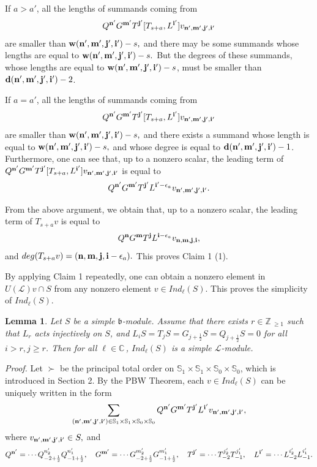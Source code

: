 \documentclass[12pt]{article}
\def\ssc{\scriptscriptstyle}
\def\Z{\mathbb{Z}{\ssc\,}}
\def\C{\mathbb{C}{\ssc\,}}
\numberwithin{equation}{section}
\newtheorem{lemm}[theo]{Lemma}
\begin{document}
If  $a>a'$, all the lengths of summands coming from
$$Q^{\bf n'}G^{\bf m'}T^{\bf j'}[T_{s+a},L^{\bf i'}]v_{\bf n',m',j',i'}$$ are  smaller than ${\bf w(n',m',j',i')}-s,$ and there may be some summands whose lengths are equal to ${\bf w(n',m',j',i')}-s.$ But the degrees of these summands, whose lengths are equal to ${\bf w(n',m',j',i')}-s$, must be smaller than   ${\bf d(n',m',j',i')}-2$.

If $a=a'$,  all the lengths of summands coming from
$$Q^{\bf n'}G^{\bf m'}T^{\bf j'}[T_{s+a},L^{\bf i'}]v_{\bf n',m',j',i'}$$ are  smaller than ${\bf w(n',m',j',i')}-s,$ and there exists a  summand whose length is equal to ${\bf w(n',m',j',i')}-s,$ and whose degree is equal to
${\bf d(n',m',j',i')}-1$. Furthermore, one can see that, up to a  nonzero scalar,    the leading term of $Q^{\bf n'}G^{\bf m'}T^{\bf j'}[T_{s+a},L^{\bf i'}]v_{\bf n',m',j',i'}$ is equal to
$$Q^{\bf n'}G^{\bf m'}T^{\bf j'}L^{{\bf i'}-\epsilon_a}v_{\bf n',m',j',i'}.$$



From the above argument, we obtain that, up to a  nonzero scalar,  the leading term of $T_{s+a}v$ is equal to
$$Q^{\bf n}G^{\bf m}T^{\bf j}L^{{\bf i}-\epsilon_a}v_{\bf n,m,j,i},$$ and $deg(T_{s+a}v)=({\bf n,m,j,i}-\epsilon_a).$ This proves  Claim 1 (1).

By applying Claim 1 repeatedly,  one can obtain a nonzero element in $U(\mathcal{L})v\cap S$ from any nonzero element $v\in Ind_\ell(S)$.  This proves the simplicity of $Ind_\ell(S)$.



\begin{lemm}\label{Lb-irr} Let   $S$ be a simple $\mathfrak{b}$-module. Assume that there exists $r\in\Z_{\ge 1}$ such that $L_r$ acts injectively on $S$, and  $L_iS=T_jS=G_{j+\frac{1}{2}}S=Q_{j+\frac{1}{2}}S=0$ for all $i>r,j\ge r$.
Then for all $\ell\in\C$, $Ind_\ell(S)$ is a simple $\mathcal{L}$-module.
\end{lemm}


{\it Proof.}   Let $\succ$ be the principal  total order on $\mathbb{S}_1\times \mathbb{S}_1\times \mathbb{S}_0\times \mathbb{S}_0$, which is introduced in Section 2. By the PBW Theorem, each $v\in Ind_\ell(S)$ can be uniquely written in  the form
\begin{equation}\label{PBWform}
\sum\limits_{({\bf n',m',j',i'})\in \mathbb{S}_1\times \mathbb{S}_1\times \mathbb{S}_0\times \mathbb{S}_0}Q^{\bf n'}G^{\bf m'}T^{\bf j'}L^{\bf i'}v_{\bf n',m',j',i'},
\end{equation}
 where $v_{{\bf n',m',j',i'}}\in S,$ and $$Q^{{\bf n'}}=\cdots Q_{-2+\frac{1}{2}}^{n'_{2}} Q_{-1+\frac{1}{2}}^{n'_{1}}, \quad
 G^{{\bf m'}}=\cdots G_{-2+\frac{1}{2}}^{m'_{2}} G_{-1+\frac{1}{2}}^{m'_{1}},\quad
 T^{{\bf j'}}=\cdots T_{-2}^{j'_{2}} T_{-1}^{j'_{1}},\quad
 L^{{\bf i'}}=\cdots L_{-2}^{i'_{2}} L_{-1}^{i'_{1}}.$$
\end{document}
